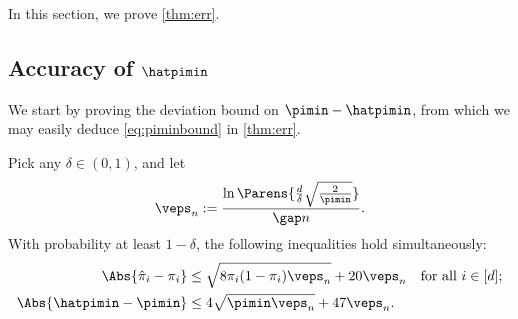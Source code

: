 
In this section, we prove \cref{thm:err}.

\subsection{Accuracy of $\hatpimin$}

We start by proving the deviation bound on $\pimin-\hatpimin$, from
which we may easily deduce \cref{eq:piminbound} in \cref{thm:err}.
\begin{lemma}
  \label{lem:hatpimin}
  Pick any $\delta \in (0,1)$, and let
  \begin{equation}
    \veps_n :=
    \frac{ \ln\Parens{\frac{d}\delta\sqrt{\frac{2}{\pimin}}} }{\gap n}
    .
    \label{eq:singleton-veps}
  \end{equation}
  With probability at least $1-\delta$, the following inequalities
  hold simultaneously:
  \begin{align}
    \Abs{\hat{\pi}_i-\pi_i}
    & \le
    \sqrt{8\pi_i(1-\pi_i) \veps_n}
    + 20 \veps_n
    \quad \text{for all $i \in [d]$}
    ;
    \label{eq:singletonboundsimple}
    \\
    \Abs{\hatpimin - \pimin}
    & \leq
    4\sqrt{\pimin\veps_n}
    + 47\veps_n
    .
    \label{eq:hatpimin}
  \end{align}
\end{lemma}
